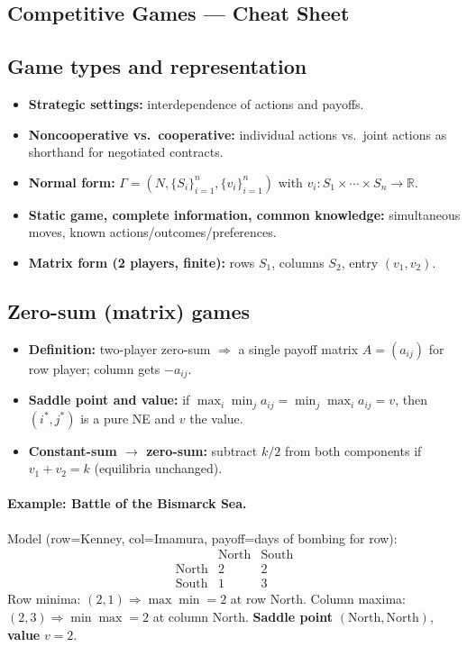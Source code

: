 \documentclass[11pt]{article}
\begin{document}
\begin{multicols}{2}
\section*{Competitive Games — Cheat Sheet}

\subsection*{Game types and representation}
\begin{itemize}
  \item \textbf{Strategic settings:} interdependence of actions and payoffs.
  \item \textbf{Noncooperative vs.\ cooperative:} individual actions vs.\ joint actions as shorthand for negotiated contracts.
  \item \textbf{Normal form:} $\Gamma=(N,\{S_i\}_{i=1}^n,\{v_i\}_{i=1}^n)$ with $v_i:S_1\times\cdots\times S_n\to\mathbb R$.
  \item \textbf{Static game, complete information, common knowledge:} simultaneous moves, known actions/outcomes/preferences.
  \item \textbf{Matrix form (2 players, finite):} rows $S_1$, columns $S_2$, entry $(v_1,v_2)$.
\end{itemize}

\subsection*{Zero-sum (matrix) games}
\begin{itemize}
  \item \textbf{Definition:} two-player zero-sum $\Rightarrow$ a single payoff matrix $A=(a_{ij})$ for row player; column gets $-a_{ij}$.
  \item \textbf{Saddle point and value:} if $\max_i\min_j a_{ij}=\min_j\max_i a_{ij}=v$, then $(i^*,j^*)$ is a pure NE and $v$ the value.
  \item \textbf{Constant-sum $\to$ zero-sum:} subtract $k/2$ from both components if $v_1+v_2=k$ (equilibria unchanged).
\end{itemize}

\paragraph{Example: Battle of the Bismarck Sea.}
Model (row=Kenney, col=Imamura, payoff=days of bombing for row):
\[
\begin{array}{c|cc}
 & \text{North} & \text{South}\\\hline
\text{North} & 2 & 2\\
\text{South} & 1 & 3
\end{array}
\]
Row minima: $(2,1)\Rightarrow \max\min=2$ at row North. Column maxima: $(2,3)\Rightarrow \min\max=2$ at column North.
\textbf{Saddle point} $(\text{North},\text{North})$, \textbf{value} $v=2$.


\end{multicols}
\end{document}
